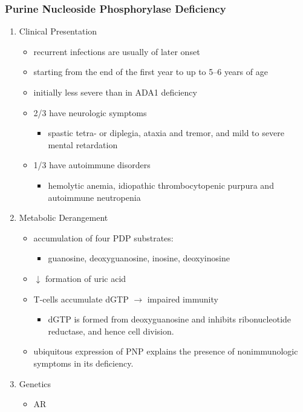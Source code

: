 \documentclass{scrartcl}
\begin{document}
\subsubsection{Purine Nucleoside Phosphorylase Deficiency}
\label{sec:org8f7808d}
\begin{enumerate}
\item Clinical Presentation
\label{sec:orge22d01c}
\begin{itemize}
\item recurrent infections are usually of later onset
\item starting from the end of the first year to up to 5–6 years of age
\item initially less severe than in ADA1 deficiency
\item 2/3 have neurologic symptoms
\begin{itemize}
\item spastic tetra- or diplegia, ataxia and tremor, and mild to severe
mental retardation
\end{itemize}
\item 1/3 have autoimmune disorders
\begin{itemize}
\item hemolytic anemia, idiopathic thrombocytopenic purpura and
autoimmune neutropenia
\end{itemize}
\end{itemize}

\item Metabolic Derangement
\label{sec:org2907828}
\begin{itemize}
\item accumulation of four PDP substrates:
\begin{itemize}
\item guanosine, deoxyguanosine, inosine, deoxyinosine
\end{itemize}
\item \(\downarrow\) formation of uric acid
\item T-cells accumulate dGTP \(\to\) impaired immunity
\begin{itemize}
\item dGTP is formed from deoxyguanosine and inhibits ribonucleotide
reductase, and hence cell division.
\end{itemize}
\item ubiquitous expression of PNP explains the presence of nonimmunologic
symptoms in its deficiency.
\end{itemize}

\item Genetics
\label{sec:org4eac4a6}
\begin{itemize}
\item AR
\end{itemize}


\end{enumerate}
\end{document}
